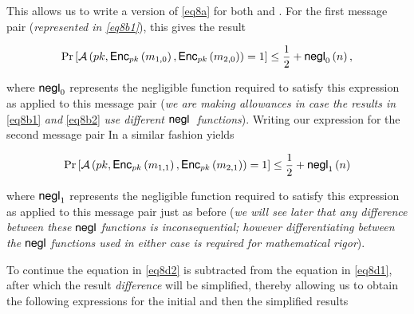\documentclass[../CryptoFinal.tex]{subfiles}
\begin{document}
\begin{flushleft}
This allows us to write a version of \ref{eq8a} for both \label{eq8b1} and \label{eq8b2}.  For the first message pair (\emph{represented in \ref{eq8b1}}), this gives the result

\begin{align}
  \Pr \left[ \mathcal{A} \left( pk,  \text{{\fontfamily{phv}\selectfont Enc}}_{pk} \left( m_{1, 0} \right), \text{{\fontfamily{phv}\selectfont Enc}}_{pk} \left( m_{2, 0} \right) \right) = 1 \right] \leq \frac{1}{2} + \text{{\fontfamily{phv}\selectfont negl}}_0 \left( n \right), \label{eq8d1}
\end{align}

where $\text{{\fontfamily{phv}\selectfont negl}}_0$ represents the negligible function required to satisfy this expression as applied to this message pair (\emph{we are making allowances in case the results in} \ref{eq8b1} \emph{and} \ref{eq8b2} \emph{use different} $\text{{\fontfamily{phv}\selectfont negl }}$ \emph{functions}).  Writing our expression for the second message pair In a similar fashion yields

\begin{align}
  \Pr \left[ \mathcal{A} \left( pk,  \text{{\fontfamily{phv}\selectfont Enc}}_{pk} \left( m_{1, 1} \right), \text{{\fontfamily{phv}\selectfont Enc}}_{pk} \left( m_{2, 1} \right) \right) = 1 \right] \leq \frac{1}{2} + \text{{\fontfamily{phv}\selectfont negl}}_1 \left( n \right) \label{eq8d2}
\end{align}

where $\text{{\fontfamily{phv}\selectfont negl}}_1$ represents the negligible function required to satisfy this expression as applied to this message pair just as before (\emph{we will see later that any difference between these} $\text{{\fontfamily{phv}\selectfont negl}}$ \emph{functions is inconsequential; however differentiating between the} $\text{{\fontfamily{phv}\selectfont negl}}$ \emph{functions used in either case is required for mathematical rigor}). \newline


To continue the equation in \ref{eq8d2} is subtracted from the equation in \ref{eq8d1}, after which the result \emph{difference} will be simplified, thereby allowing us to obtain the following expressions for the initial and then the simplified results  


\end{flushleft}
\end{document}
